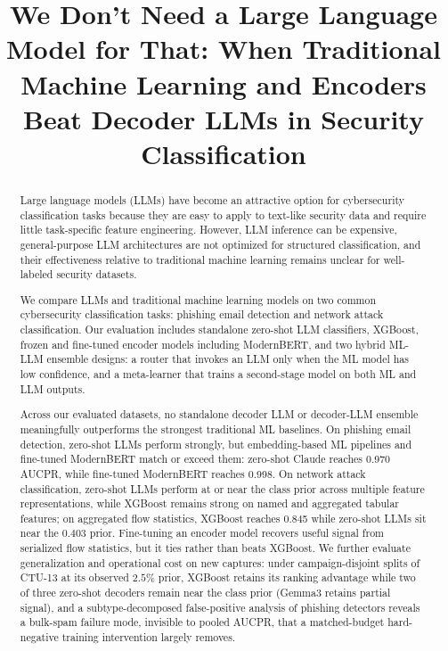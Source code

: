 \documentclass{jmlr}
\title[We Don't Need an LLM for That]{We Don't Need a Large Language Model for That: When Traditional Machine Learning and Encoders Beat Decoder LLMs in Security Classification}
\begin{document}
\maketitle

\begin{abstract}
Large language models (LLMs) have become an attractive option for cybersecurity classification tasks because they are easy to apply to text-like security data and require little task-specific feature engineering. However, LLM inference can be expensive, general-purpose LLM architectures are not optimized for structured classification, and their effectiveness relative to traditional machine learning remains unclear for well-labeled security datasets.

We compare LLMs and traditional machine learning models on two common cybersecurity classification tasks: phishing email detection and network attack classification. Our evaluation includes standalone zero-shot LLM classifiers, XGBoost, frozen and fine-tuned encoder models including ModernBERT, and two hybrid ML-LLM ensemble designs: a router that invokes an LLM only when the ML model has low confidence, and a meta-learner that trains a second-stage model on both ML and LLM outputs.

Across our evaluated datasets, no standalone decoder LLM or decoder-LLM ensemble meaningfully outperforms the strongest traditional ML baselines. On phishing email detection, zero-shot LLMs perform strongly, but embedding-based ML pipelines and fine-tuned ModernBERT match or exceed them: zero-shot Claude reaches 0.970 AUCPR, while fine-tuned ModernBERT reaches 0.998. On network attack classification, zero-shot LLMs perform at or near the class prior across multiple feature representations, while XGBoost remains strong on named and aggregated tabular features; on aggregated flow statistics, XGBoost reaches 0.845 while zero-shot LLMs sit near the 0.403 prior. Fine-tuning an encoder model recovers useful signal from serialized flow statistics, but it ties rather than beats XGBoost. We further evaluate generalization and operational cost on new captures: under campaign-disjoint splits of CTU-13 at its observed $2.5\%$ prior, XGBoost retains its ranking advantage while two of three zero-shot decoders remain near the class prior (Gemma3 retains partial signal), and a subtype-decomposed false-positive analysis of phishing detectors reveals a bulk-spam failure mode, invisible to pooled AUCPR, that a matched-budget hard-negative training intervention largely removes.


\end{abstract}
\end{document}
